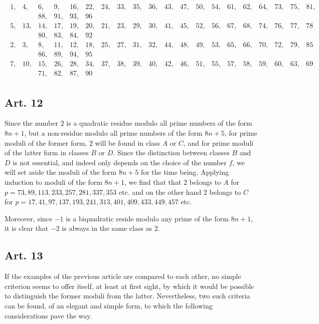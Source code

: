 \documentclass{book}
\theoremstyle{plain}
\theoremstyle{remark}
\begin{document}
\begin{align*}
\begin{array}{|rrrrrrrrrrrrrrrrrrrrrr}
1,&4,&6,&9,&16,&22,&24,&33,&35,&36,&43,&47,&50,&54,&61,&62,&64,&73,&75,&81,\\
&&88,&91,&93,&96 \\ 
5,&13,&14,& 17,&19,&20,&21,&23,&29,&30,&41,&45,&52,&56,&67,&68,&74,&76,&77,&78 \\ 
&&80,&83,&84,&92 \\
2,& 3,& 8,&11,&12,&18,&25,&27,&31,&32,&44,&48,&49,&53,&65,&66,&70,&72,&79,&85 \\ 
&&86,&89,&94,&95\\
7,&10,&15,&26,&28,&34,& 37,&38,&39,&40,&42,&46,&51,&55,&57,&58,&59,&60,&63,&69 \\
&&71,&82,&87,&90
\end{array} 
\end{align*}

\subsection*{Art. 12}

Since the number $2$ is a quadratic residue modulo all prime numbers of the form $8n+1$, but a non-residue modulo all prime numbers of the form $8n+5$, for prime moduli of the former form, $2$ will be found in class $A$ or $C$, and for prime moduli of the latter form in classes $B$ or $D$.  Since the distinction between classes $B$ and $D$ is not essential, and indeed only depends on the choice of the number $f$, we will set aside the moduli of the form $8n+5$ for the time being.  Applying induction to  moduli of the form $8n+1$, we find that that $2$ belongs to $A$ for $p=73,89,113,233,257,281,337,353$ etc. and on the other hand $2$ belongs to $C$ for $p=17,41,97,137,193, 241,313,401,409,433,449,457$ etc.  

Moreover, since $-1$ is a biquadratic reside modulo any prime of the form $8n+1$, it is clear that $-2$ is always in the same class as $2$. 

\subsection*{Art. 13}

If the examples of the previous article are compared to each other, no simple criterion seems to offer itself, at least at first sight, by which it would be possible to distinguish the former moduli from the latter.  Nevertheless, two such criteria can be found, of an elegant and simple form, to which the following considerations pave the way. 
\end{document}
